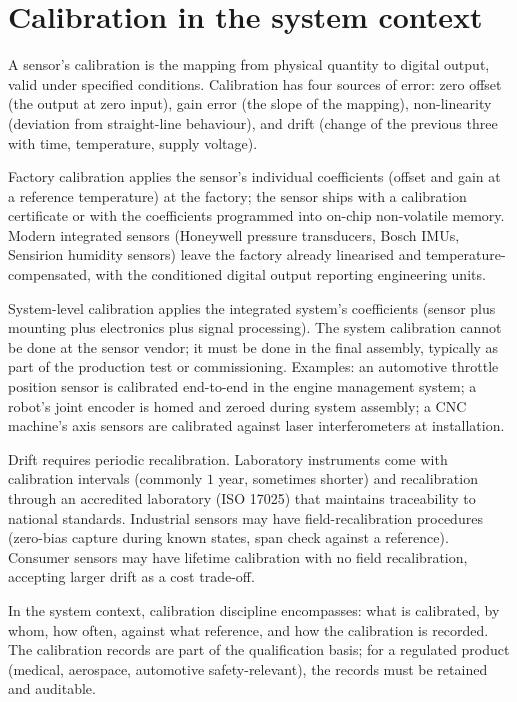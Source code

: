\section{Calibration in the system context}

A sensor's calibration is the mapping from physical quantity to digital output, valid under specified conditions. Calibration has four sources of error: zero offset (the output at zero input), gain error (the slope of the mapping), non-linearity (deviation from straight-line behaviour), and drift (change of the previous three with time, temperature, supply voltage).

Factory calibration applies the sensor's individual coefficients (offset and gain at a reference temperature) at the factory; the sensor ships with a calibration certificate or with the coefficients programmed into on-chip non-volatile memory. Modern integrated sensors (Honeywell pressure transducers, Bosch IMUs, Sensirion humidity sensors) leave the factory already linearised and temperature-compensated, with the conditioned digital output reporting engineering units.

System-level calibration applies the integrated system's coefficients (sensor plus mounting plus electronics plus signal processing). The system calibration cannot be done at the sensor vendor; it must be done in the final assembly, typically as part of the production test or commissioning. Examples: an automotive throttle position sensor is calibrated end-to-end in the engine management system; a robot's joint encoder is homed and zeroed during system assembly; a CNC machine's axis sensors are calibrated against laser interferometers at installation.

Drift requires periodic recalibration. Laboratory instruments come with calibration intervals (commonly $1$ year, sometimes shorter) and recalibration through an accredited laboratory (ISO 17025) that maintains traceability to national standards. Industrial sensors may have field-recalibration procedures (zero-bias capture during known states, span check against a reference). Consumer sensors may have lifetime calibration with no field recalibration, accepting larger drift as a cost trade-off.

In the system context, calibration discipline encompasses: what is calibrated, by whom, how often, against what reference, and how the calibration is recorded. The calibration records are part of the qualification basis; for a regulated product (medical, aerospace, automotive safety-relevant), the records must be retained and auditable.

